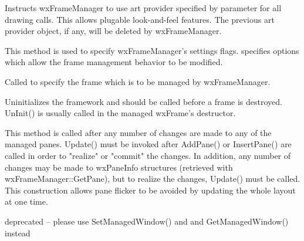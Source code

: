 Instructs wxFrameManager to use art provider specified by parameter
 for all drawing calls. This allows plugable
look-and-feel features. The previous art provider object, if any,
will be deleted by wxFrameManager.

\label{wxframemanagersetflags}


This method is used to specify wxFrameManager's settings flags. 
specifies options which allow the frame management behavior to be modified.

\label{wxframemanagersetmanagedwindow}


Called to specify the frame which is to be managed by wxFrameManager.

\label{wxframemanagershowhint}



\label{wxframemanageruninit}


Uninitializes the framework and should be called before a frame is
destroyed. UnInit() is usually called in the managed wxFrame's destructor.

\label{wxframemanagerupdate}


This method is called after any number of changes are
made to any of the managed panes. Update() must be invoked after
AddPane() or InsertPane() are called in order to "realize" or "commit"
the changes. In addition, any number of changes may be made to
wxPaneInfo structures (retrieved with wxFrameManager::GetPane), but to
realize the changes, Update() must be called. This construction allows
pane flicker to be avoided by updating the whole layout at one time.

\label{wxframemanagerupdatebuttononscreen}



\label{wxframemanagerwxdeprecated}


deprecated -- please use SetManagedWindow() and
and GetManagedWindow() instead



